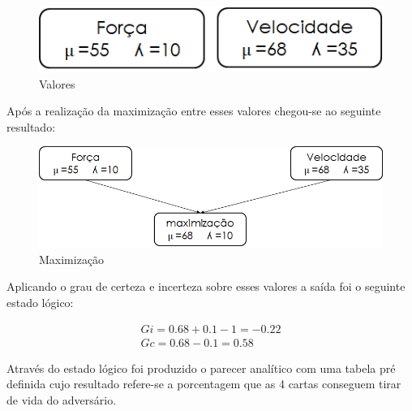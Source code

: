 \begin{figure}[htb]
	\caption{
		\label{fig:forca} 
		Valores
	}
	\begin{center}
		\includegraphics[scale=0.5]{imagens/valores.png}
	\end{center}

\end{figure}

Após a realização da maximização entre esses valores chegou-se ao seguinte resultado:

\begin{figure}[htb]
	\caption{
		\label{flg:max}
		Maximização
	}
	\begin{center}
		\includegraphics[scale=0.5]{imagens/max.png}
	\end{center}
\end{figure}

Aplicando o grau de certeza e incerteza sobre esses valores a saída foi o seguinte estado lógico:

\begin{equation*}
	\begin{array}{cc}
	Gi = 0.68 + 0.1 -1 = -0.22 \\
	Gc = 0.68 - 0.1 = 0.58
	\end{array}
\end{equation*}

Através do estado lógico foi produzido o parecer analítico com uma tabela pré definida cujo resultado refere-se a porcentagem que as 4 cartas conseguem tirar de vida do adversário.

\newpage

